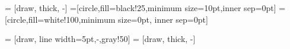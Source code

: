 

\def\network{{(0.1, -0.5)/-}, {(0.3, -1)/a}, {(0.7, -1.5)/b}, {(1.2, -2)/c}, {(1.8, -2)/e}, {(2.3, -1.5)/f}, {(2.7, -1)/g}, {(2.9, -0.5)/h}, {(1, -0.5)/i}, {(2, -0.5)/j}}
\def\connect{s/-, -/a, a/b, b/c, c/e, e/f, f/g, g/h, h/t}
\def\connectExtra{-/i, j/h}


\setlength{\parskip}{5mm}

 = [draw, thick, -]
=[circle,fill=black!25,minimum size=10pt,inner sep=0pt]
=[circle,fill=white!100,minimum size=0pt, inner sep=0pt]

 = [draw, line width=5pt,-,gray!50]
 = [draw, thick, -]

